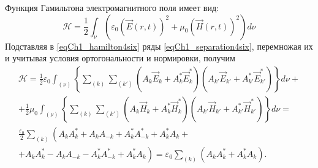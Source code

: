 Функция Гамильтона электромагнитного поля имеет вид:
\begin{equation}
\mathcal{H} = \frac{1}{2}
\int_{\nu}\left( \varepsilon_0\left(\vec{E}\left(r,t\right)\right)^2 + \mu_0
\left(\vec{H}\left(r,t\right)\right)^2\right) d\nu
\label{eqCh1_hamilton4six}
\end{equation}
Подставляя в \eqref{eqCh1_hamilton4six} ряды
\eqref{eqCh1_separation4six}, перемножая их и учитывая условия
ортогональности и нормировки, получим 
\begin{eqnarray}
\mathcal{H} = \frac{1}{2} \varepsilon_0
\int_{(\nu)}\left\{
\sum_{(k)}\sum_{(k')}
\left(A_k\vec{E}_k + A_k^{*}\vec{E}_k^{*}\right)
\left(A_{k'}\vec{E}_{k'} + A_{k'}^{*}\vec{E}_{k'}^{*}\right)
\right\}d \nu +
\nonumber \\
+ 
\frac{1}{2} \mu_0
\int_{(\nu)}\left\{
\sum_{(k)}\sum_{(k')}
\left(A_k\vec{H}_k + A_k^{*}\vec{H}_k^{*}\right)
\left(A_{k'}\vec{H}_{k'} + A_{k'}^{*}\vec{H}_{k'}^{*}\right)
\right\} d \nu = 
\nonumber \\
\frac{\varepsilon_0}{2} \sum_{(k)} 
\left(
A_k A_k^{*} + A_k A_{-k} + A_k^{*} A_{-k}^{*} + A_k^{*} A_k +
\right.
\nonumber \\
\left.
+ A_k A_k^{*} - A_k A_{-k} - A_k^{*} A_{-k}^{*} + A_k^{*} A_k
\right) = \varepsilon_0 \sum_{(k)} 
\left(A_k A_k^{*} + A_k^{*} A_k \right).
\label{eqCh1_separation4hamilton}
\end{eqnarray}
